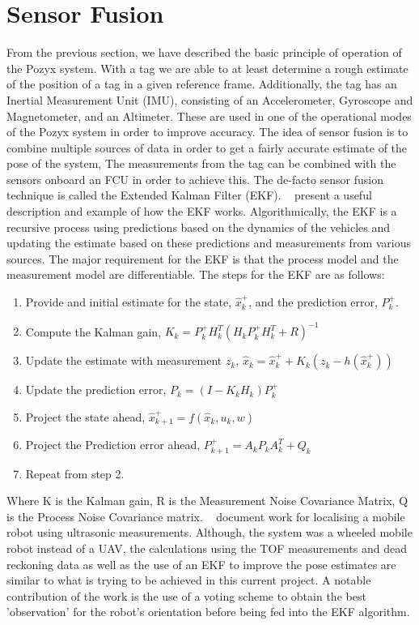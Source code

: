\section{Sensor Fusion}\label{sec:sensor_fusion}
From the previous section, we have described the basic principle of operation of the Pozyx system.
With a tag we are able to at least determine a rough estimate of the position of a tag in a given reference frame.
Additionally, the tag has an Inertial Measurement Unit (IMU), consisting of an Accelerometer, Gyroscope and Magnetometer, and an Altimeter.
These are used in one of the operational modes of the Pozyx system in order to improve accuracy.
The idea of sensor fusion is to combine multiple sources of data in order to get a fairly accurate estimate of the pose of the system,
The measurements from the tag can be combined with the sensors onboard an FCU in order to achieve this.
The de-facto sensor fusion technique is called the Extended Kalman Filter (EKF).
~\citet{simpleekf} present a useful description and example of how the EKF works.
Algorithmically, the EKF is a recursive process using predictions based on the dynamics of the vehicles and updating the estimate based on these predictions and measurements from various sources.
The major requirement for the EKF is that the process model and the measurement model are differentiable.
The steps for the EKF are as follows:
\begin{enumerate}
    \item Provide and initial estimate for the state, $\hat{x}^+_k$, and the prediction error, $P^+_k$.
    \item Compute the Kalman gain, $K_k = P^+_{k}H_k^T(H_k P^+_{k}H_k^T + R)^{-1}$
    \item Update the estimate with measurement $z_k$, $\hat{x}_k=\hat{x}^+_k + K_k(z_k - h(\hat{x}^+_k))$
    \item Update the prediction error, $P_k = (I - K_k H_k)P^+_{k}$
    \item Project the state ahead, $\hat{x}^+_{k+1} = f(\hat{x}_k, u_k, w)$
    \item Project the Prediction error ahead, $P^+_{k+1} = A_k P_k A_k^T + Q_k$
    \item Repeat from step 2.
\end{enumerate}
Where K is the Kalman gain, R is the Measurement Noise Covariance Matrix, Q is the Process Noise Covariance matrix.
~\citet{tsai1998localization} document work for localising a mobile robot using ultrasonic measurements.
Although, the system was a wheeled mobile robot instead of a UAV, the calculations using the TOF measurements and dead reckoning data as well as the use of an EKF to improve the pose estimates are similar to what is trying to be achieved in this current project.
A notable contribution of the work is the use of a voting scheme to obtain the best 'observation' for the robot's orientation before being fed into the EKF algorithm.


